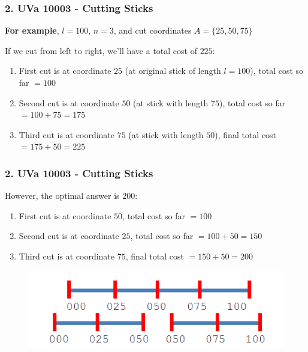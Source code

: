 \documentclass{beamer}
\begin{document}
\begin{frame}[fragile]
\frametitle{2. UVa 10003 - Cutting Sticks}

\textbf{For example}, $l=100$, $n=3$, and cut coordinates $A=\{25,50,75\}$

\vspace{0.3cm}

If we cut from left to right, we'll have a total cost of $225$:
\begin{enumerate}
    \item First cut is at coordinate $25$ (at original stick of length $l=100$), total cost so far $= 100$
    \item Second cut is at coordinate $50$ (at stick with length $75$), total cost so far $= 100 + 75 = 175$
    \item Third cut is at coordinate $75$ (at stick with length $50$), final total cost $= 175 + 50 = 225$
\end{enumerate}

\end{frame}

\begin{frame}[fragile]
\frametitle{2. UVa 10003 - Cutting Sticks}

However, the optimal answer is $200$:
\begin{enumerate}
    \item First cut is at coordinate $50$, total cost so far $= 100$
    \item Second cut is at coordinate $25$, total cost so far $= 100 + 50 = 150$
    \item Third cut is at coordinate $75$, final total cost $= 150 + 50 = 200$
\end{enumerate}

\begin{figure}
    \centering
    \includegraphics[scale=0.5]{imgs/cutting_sticks.png}
\end{figure}

\end{frame}
\end{document}
